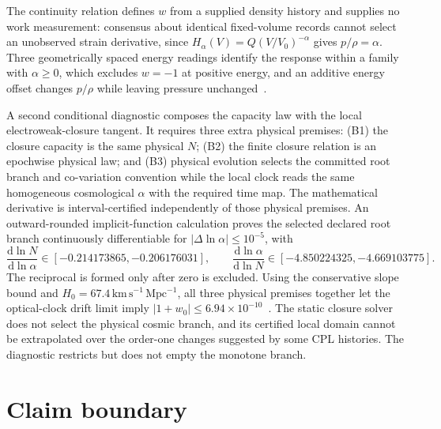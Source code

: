 \documentclass[11pt]{article}
\theoremstyle{remark}
\begin{document}
The continuity relation defines \(w\) from a supplied density history and
supplies no work measurement: consensus about identical fixed-volume records
cannot select an unobserved strain derivative, since
\(H_\alpha(V)=Q(V/V_0)^{-\alpha}\) gives \(p/\rho=\alpha\). Three geometrically
spaced energy readings identify the response within a family with \(\alpha\ge0\),
which excludes \(w=-1\) at positive energy, and an additive energy offset changes
\(p/\rho\) while leaving pressure unchanged~\cite{ophobservers}.

A second conditional diagnostic composes the capacity law with the local
electroweak-closure tangent. It requires three extra physical premises: (B1)
the closure capacity is the same physical \(N\); (B2) the finite closure
relation is an epochwise physical law; and (B3) physical evolution selects the
committed root branch and co-variation convention while the local clock reads
the same homogeneous cosmological \(\alpha\) with the required time map. The
mathematical derivative is interval-certified independently of those physical
premises. An outward-rounded implicit-function calculation proves the selected
declared root branch continuously differentiable for
\(\lvert\Delta\ln\alpha\rvert\le10^{-5}\), with
\[
 \frac{\mathrm d\ln N}{\mathrm d\ln\alpha}
 \in[-0.214173865,-0.206176031],\qquad
 \frac{\mathrm d\ln\alpha}{\mathrm d\ln N}
 \in[-4.850224325,-4.669103775].
\]
The reciprocal is formed only after zero is excluded. Using the conservative
slope bound and \(H_0=67.4\,\mathrm{km\,s^{-1}\,Mpc^{-1}}\), all three
physical premises together let the optical-clock drift limit imply
\(\lvert1+w_0\rvert\le6.94\times10^{-10}\)~\cite{filzinger2023}. The static
closure solver does not select the physical cosmic branch, and its certified
local domain cannot be extrapolated over the order-one changes suggested by
some CPL histories. The diagnostic restricts but does not empty the monotone
branch.

\section{Claim boundary}
\end{document}
